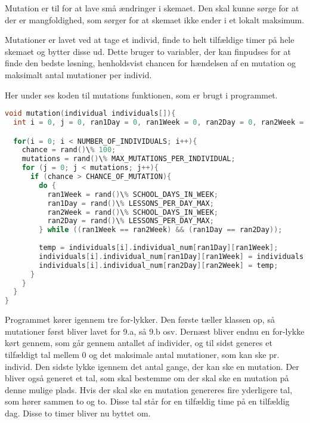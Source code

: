 Mutation er til for at lave små ændringer i skemaet. Den skal kunne sørge for at der er mangfoldighed, som sørger for at skemaet ikke ender i et lokalt maksimum. %

Mutationer er lavet ved at tage et individ, finde to helt tilfældige timer på hele skemaet og bytter disse ud. Dette bruger to variabler, der kan finpudses for at finde den bedste løsning, henholdsvist chancen for hændelsen af en mutation og maksimalt antal mutationer per individ.

Her under ses koden til mutations funktionen, som er brugt i programmet.

\begin{lstlisting}[language = C]
void mutation(individual individuals[]){
  int i = 0, j = 0, ran1Day = 0, ran1Week = 0, ran2Day = 0, ran2Week = 0, chance = 0, mutations = 0, temp = 0;

  for(i = 0; i < NUMBER_OF_INDIVIDUALS; i++){
    chance = rand()\% 100;
    mutations = rand()\% MAX_MUTATIONS_PER_INDIVIDUAL;
    for (j = 0; j < mutations; j++){
      if (chance > CHANCE_OF_MUTATION){
        do {
          ran1Week = rand()\% SCHOOL_DAYS_IN_WEEK;
          ran1Day = rand()\% LESSONS_PER_DAY_MAX;
          ran2Week = rand()\% SCHOOL_DAYS_IN_WEEK;
          ran2Day = rand()\% LESSONS_PER_DAY_MAX;
        } while ((ran1Week == ran2Week) && (ran1Day == ran2Day));
        
        temp = individuals[i].individual_num[ran1Day][ran1Week];
        individuals[i].individual_num[ran1Day][ran1Week] = individuals[i].individual_num[ran2Day][ran2Week];
        individuals[i].individual_num[ran2Day][ran2Week] = temp;
      }
    }
  }
}
\end{lstlisting}

Programmet kører igennem tre for-lykker. Den første tæller klassen op, så mutationer først bliver lavet for 9.a, så 9.b osv. Dernæst bliver endnu en for-lykke kørt gennem, som går gennem antallet af individer, og til sidst generes et tilfældigt tal mellem 0 og det maksimale antal mutationer, som kan ske pr. individ. Den sidste lykke igennem det antal gange, der kan ske en mutation. Der bliver også generet et tal, som skal bestemme om der skal ske en mutation på denne mulige plads. Hvis der skal ske en mutation genereres fire yderligere tal, som hører sammen to og to. Disse tal står for en tilfældig time på en tilfældig dag. Disse to timer bliver nu byttet om. 
